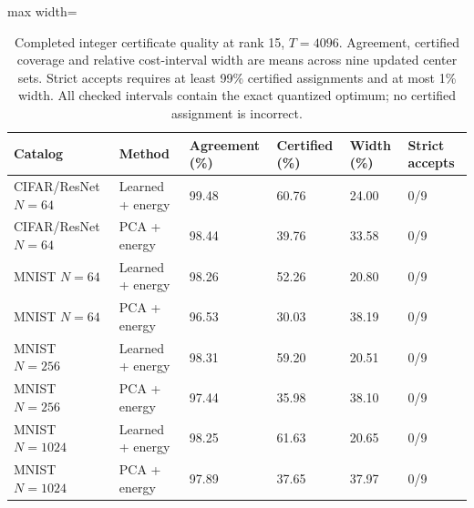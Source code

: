 \begin{table}[tp]
\caption{Completed integer certificate quality at rank 15, $T=4096$. Agreement, certified coverage and relative cost-interval width are means across nine updated center sets. Strict accepts requires at least 99\% certified assignments and at most 1\% width. All checked intervals contain the exact quantized optimum; no certified assignment is incorrect.}\label{tab:matched-certificate-quality}
\centering\small
\begin{adjustbox}{max width=\textwidth}
\begin{tabular}{@{}llllll@{}}
\toprule
Catalog & Method & Agreement (\%) & Certified (\%) & Width (\%) & Strict accepts \\
\midrule
CIFAR/ResNet $N=64$ & Learned + energy & 99.48 & 60.76 & 24.00 & 0/9 \\
CIFAR/ResNet $N=64$ & PCA + energy & 98.44 & 39.76 & 33.58 & 0/9 \\
MNIST $N=64$ & Learned + energy & 98.26 & 52.26 & 20.80 & 0/9 \\
MNIST $N=64$ & PCA + energy & 96.53 & 30.03 & 38.19 & 0/9 \\
MNIST $N=256$ & Learned + energy & 98.31 & 59.20 & 20.51 & 0/9 \\
MNIST $N=256$ & PCA + energy & 97.44 & 35.98 & 38.10 & 0/9 \\
MNIST $N=1024$ & Learned + energy & 98.25 & 61.63 & 20.65 & 0/9 \\
MNIST $N=1024$ & PCA + energy & 97.89 & 37.65 & 37.97 & 0/9 \\
\bottomrule
\end{tabular}
\end{adjustbox}
\end{table}
